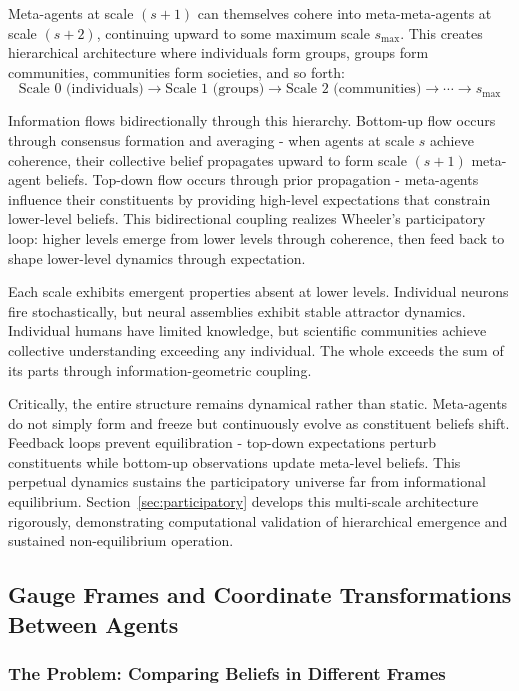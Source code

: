 \documentclass[11pt]{article}
\begin{document}
Meta-agents at scale $(s+1)$ can themselves cohere into meta-meta-agents at scale $(s+2)$, continuing upward to some maximum scale $s_{\max}$. This creates hierarchical architecture where individuals form groups, groups form communities, communities form societies, and so forth:
\begin{equation}
\text{Scale 0 (individuals)} \to \text{Scale 1 (groups)} \to \text{Scale 2 (communities)} \to \cdots \to s_{\max}
\end{equation}

Information flows bidirectionally through this hierarchy. Bottom-up flow occurs through consensus formation and averaging - when agents at scale $s$ achieve coherence, their collective belief propagates upward to form scale $(s+1)$ meta-agent beliefs. Top-down flow occurs through prior propagation - meta-agents influence their constituents by providing high-level expectations that constrain lower-level beliefs. This bidirectional coupling realizes Wheeler's participatory loop: higher levels emerge from lower levels through coherence, then feed back to shape lower-level dynamics through expectation.

Each scale exhibits emergent properties absent at lower levels. Individual neurons fire stochastically, but neural assemblies exhibit stable attractor dynamics. Individual humans have limited knowledge, but scientific communities achieve collective understanding exceeding any individual. The whole exceeds the sum of its parts through information-geometric coupling.

Critically, the entire structure remains dynamical rather than static. Meta-agents do not simply form and freeze but continuously evolve as constituent beliefs shift. Feedback loops prevent equilibration - top-down expectations perturb constituents while bottom-up observations update meta-level beliefs. This perpetual dynamics sustains the participatory universe far from informational equilibrium. Section~\ref{sec:participatory} develops this multi-scale architecture rigorously, demonstrating computational validation of hierarchical emergence and sustained non-equilibrium operation.

\subsection{Gauge Frames and Coordinate Transformations Between Agents}

\subsubsection{The Problem: Comparing Beliefs in Different Frames}
\end{document}
